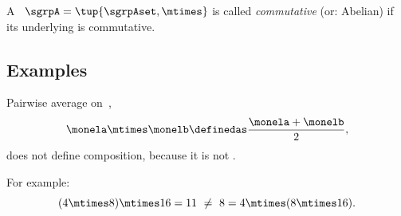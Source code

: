 \begin{definition}\label{def:commutative-semigroup}
    A ~$\sgrpA = \tup{\sgrpAset, \mtimes}$ is called \emph{commutative} (or: Abelian) if its underlying  is commutative.
\end{definition}

\subsection{Examples}


\begin{example}
    Pairwise average on~\reals,
    \begin{equation}
        \label{eq:pairwise}
        \monela \mtimes \monelb \definedas \frac{\monela + \monelb}{2},
    \end{equation}
    does not define  composition, because it is not .

    For example:
    \begin{equation}
        \label{eq:pairwise-counterexample}
        (4 \mtimes 8) \mtimes 16 = 11\ \neq\ 8 = 4 \mtimes (8 \mtimes 16).
    \end{equation}
\end{example}

